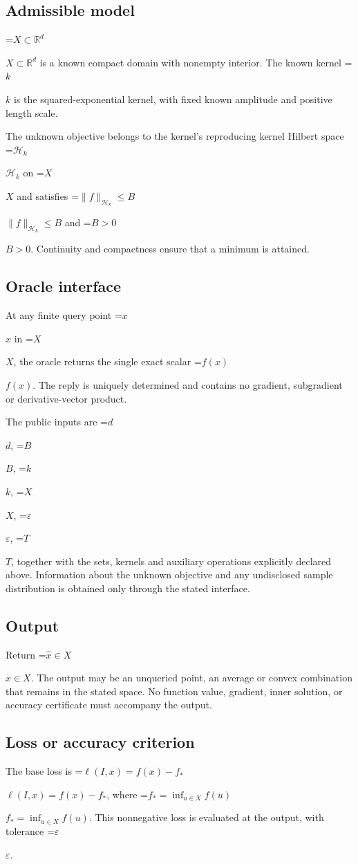 \documentclass[10pt,a4paper]{article}
\newcommand{\AtlasMath}[1]{\par\begingroup\centering\setbox0=\hbox{$\displaystyle #1$}\ifdim\wd0>1.4\linewidth\typeout{ATLAS WIDE FORMULA: \the\wd0}\fi\ifdim\wd0>\linewidth\resizebox{\linewidth}{!}{\box0}\else\box0\fi\par\endgroup}
\newcommand{\AtlasInlineMath}[1]{\begingroup\setbox0=\hbox{$#1$}\ifdim\wd0>.4\linewidth\endgroup\AtlasMath{#1}\else\endgroup$#1$\fi}
\begin{document}
\subsection{Admissible model}
\AtlasInlineMath{X\subset\mathbb{R}^d} is a known compact domain with nonempty interior. The known kernel \AtlasInlineMath{k} is the squared-exponential kernel, with fixed known amplitude and positive length scale.

The unknown objective belongs to the kernel's reproducing kernel Hilbert space \AtlasInlineMath{\mathcal{H}_k} on \AtlasInlineMath{X} and satisfies \AtlasInlineMath{\|f\|_{\mathcal{H}_k}\le B} and \AtlasInlineMath{B>0}. Continuity and compactness ensure that a minimum is attained.

\subsection{Oracle interface}
At any finite query point \AtlasInlineMath{x} in \AtlasInlineMath{X}, the oracle returns the single exact scalar \AtlasInlineMath{f(x)}. The reply is uniquely determined and contains no gradient, subgradient or derivative-vector product.

The public inputs are \AtlasInlineMath{d}, \AtlasInlineMath{B}, \AtlasInlineMath{k}, \AtlasInlineMath{X}, \AtlasInlineMath{\varepsilon}, \AtlasInlineMath{T}, together with the sets, kernels and auxiliary operations explicitly declared above. Information about the unknown objective and any undisclosed sample distribution is obtained only through the stated interface.

\subsection{Output}
Return \AtlasInlineMath{\widehat{x}\in X}. The output may be an unqueried point, an average or convex combination that remains in the stated space. No function value, gradient, inner solution, or accuracy certificate must accompany the output.

\subsection{Loss or accuracy criterion}
The base loss is \AtlasInlineMath{\ell(I,x)=f(x)-f_*}, where \AtlasInlineMath{f_*=\inf_{u\in X}f(u)}. This nonnegative loss is evaluated at the output, with tolerance \AtlasInlineMath{\varepsilon}.
\end{document}
